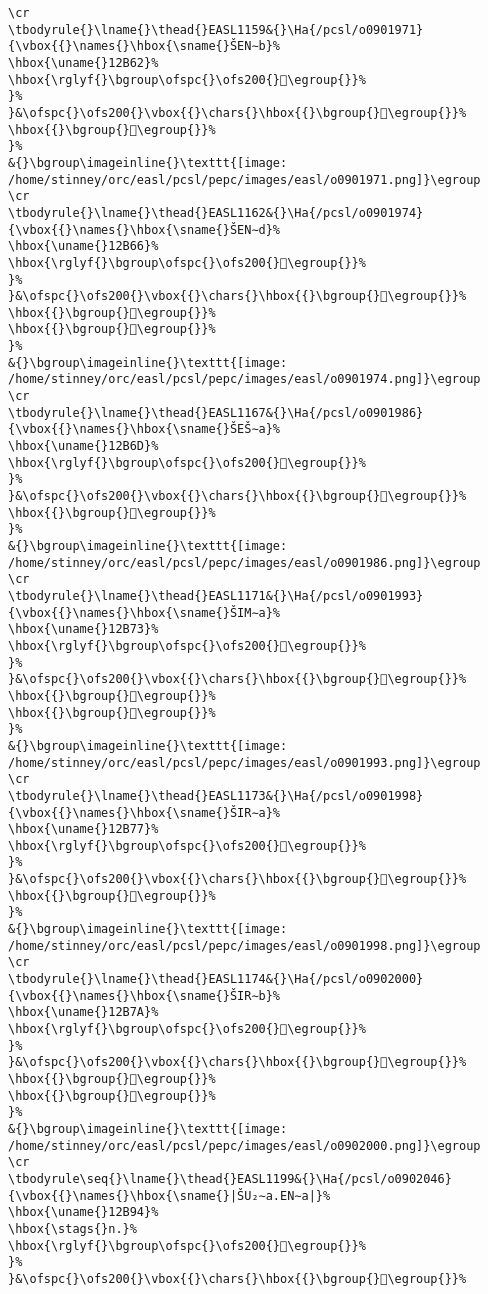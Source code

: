 \begin{verbatim}
\cr
\tbodyrule{}\lname{}\thead{}EASL1159&{}\Ha{/pcsl/o0901971}{\vbox{{}\names{}\hbox{\sname{}ŠEN∼b}%
\hbox{\uname{}12B62}%
\hbox{\rglyf{}\bgroup\ofspc{}\ofs200{}𒭢\egroup{}}%
}%
}&\ofspc{}\ofs200{}\vbox{{}\chars{}\hbox{{}\bgroup{}𒭢\egroup{}}%
\hbox{{}\bgroup{}𒭣\egroup{}}%
}%
&{}\bgroup\imageinline{}\texttt{[image: /home/stinney/orc/easl/pcsl/pepc/images/easl/o0901971.png]}\egroup
\cr
\tbodyrule{}\lname{}\thead{}EASL1162&{}\Ha{/pcsl/o0901974}{\vbox{{}\names{}\hbox{\sname{}ŠEN∼d}%
\hbox{\uname{}12B66}%
\hbox{\rglyf{}\bgroup\ofspc{}\ofs200{}𒭦\egroup{}}%
}%
}&\ofspc{}\ofs200{}\vbox{{}\chars{}\hbox{{}\bgroup{}𒭦\egroup{}}%
\hbox{{}\bgroup{}𒭨\egroup{}}%
\hbox{{}\bgroup{}𒭩\egroup{}}%
}%
&{}\bgroup\imageinline{}\texttt{[image: /home/stinney/orc/easl/pcsl/pepc/images/easl/o0901974.png]}\egroup
\cr
\tbodyrule{}\lname{}\thead{}EASL1167&{}\Ha{/pcsl/o0901986}{\vbox{{}\names{}\hbox{\sname{}ŠEŠ∼a}%
\hbox{\uname{}12B6D}%
\hbox{\rglyf{}\bgroup\ofspc{}\ofs200{}𒭭\egroup{}}%
}%
}&\ofspc{}\ofs200{}\vbox{{}\chars{}\hbox{{}\bgroup{}𒭭\egroup{}}%
\hbox{{}\bgroup{}𒭮\egroup{}}%
}%
&{}\bgroup\imageinline{}\texttt{[image: /home/stinney/orc/easl/pcsl/pepc/images/easl/o0901986.png]}\egroup
\cr
\tbodyrule{}\lname{}\thead{}EASL1171&{}\Ha{/pcsl/o0901993}{\vbox{{}\names{}\hbox{\sname{}ŠIM∼a}%
\hbox{\uname{}12B73}%
\hbox{\rglyf{}\bgroup\ofspc{}\ofs200{}𒭳\egroup{}}%
}%
}&\ofspc{}\ofs200{}\vbox{{}\chars{}\hbox{{}\bgroup{}𒭲\egroup{}}%
\hbox{{}\bgroup{}𒭳\egroup{}}%
\hbox{{}\bgroup{}𒭴\egroup{}}%
}%
&{}\bgroup\imageinline{}\texttt{[image: /home/stinney/orc/easl/pcsl/pepc/images/easl/o0901993.png]}\egroup
\cr
\tbodyrule{}\lname{}\thead{}EASL1173&{}\Ha{/pcsl/o0901998}{\vbox{{}\names{}\hbox{\sname{}ŠIR∼a}%
\hbox{\uname{}12B77}%
\hbox{\rglyf{}\bgroup\ofspc{}\ofs200{}𒭷\egroup{}}%
}%
}&\ofspc{}\ofs200{}\vbox{{}\chars{}\hbox{{}\bgroup{}𒭶\egroup{}}%
\hbox{{}\bgroup{}𒭷\egroup{}}%
}%
&{}\bgroup\imageinline{}\texttt{[image: /home/stinney/orc/easl/pcsl/pepc/images/easl/o0901998.png]}\egroup
\cr
\tbodyrule{}\lname{}\thead{}EASL1174&{}\Ha{/pcsl/o0902000}{\vbox{{}\names{}\hbox{\sname{}ŠIR∼b}%
\hbox{\uname{}12B7A}%
\hbox{\rglyf{}\bgroup\ofspc{}\ofs200{}𒭺\egroup{}}%
}%
}&\ofspc{}\ofs200{}\vbox{{}\chars{}\hbox{{}\bgroup{}𒭸\egroup{}}%
\hbox{{}\bgroup{}𒭹\egroup{}}%
\hbox{{}\bgroup{}𒭺\egroup{}}%
}%
&{}\bgroup\imageinline{}\texttt{[image: /home/stinney/orc/easl/pcsl/pepc/images/easl/o0902000.png]}\egroup
\cr
\tbodyrule\seq{}\lname{}\thead{}EASL1199&{}\Ha{/pcsl/o0902046}{\vbox{{}\names{}\hbox{\sname{}|ŠU₂∼a.EN∼a|}%
\hbox{\uname{}12B94}%
\hbox{\stags{}n.}%
\hbox{\rglyf{}\bgroup\ofspc{}\ofs200{}𒮔\egroup{}}%
}%
}&\ofspc{}\ofs200{}\vbox{{}\chars{}\hbox{{}\bgroup{}𒮓\egroup{}}%

\end{verbatim}
